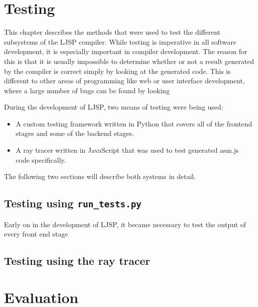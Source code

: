 \documentclass[11pt]{report}
\begin{document}
\chapter{Testing}
This chapter describes the methods that were used to test the different subsystems of the LJSP compiler. While testing is imperative in all software development, it is especially important in compiler development. The reason for this is that it is usually impossible to determine whether or not a result generated by the compiler is correct simply by looking at the generated code. This is different to other areas of programming like web or user interface development, where a large number of bugs can be found by looking 

During the development of LJSP, two means of testing were being used:
\begin{itemize}
\item A custom testing framework written in Python that covers all of the frontend stages and some of the backend stages.
\item A ray tracer written in JavaScript that was used to test generated asm.js code specifically.
\end{itemize}
The following two sections will describe both systems in detail.


\section{Testing using \texttt{run_tests.py}}
Early on in the development of LJSP, it became necessary to test the output of every front end stage 
\section{Testing using the ray tracer}


\chapter{Evaluation}
\end{document}
